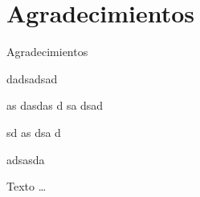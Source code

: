 
\chapter*{Agradecimientos}\label{agradecimientos_chapter}  
\thispagestyle{empty}
Agradecimientos

dadsadsad

as
dasdas
d
sa
dsad



sd
as
dsa
d



adsasda



 

Texto \ldots
